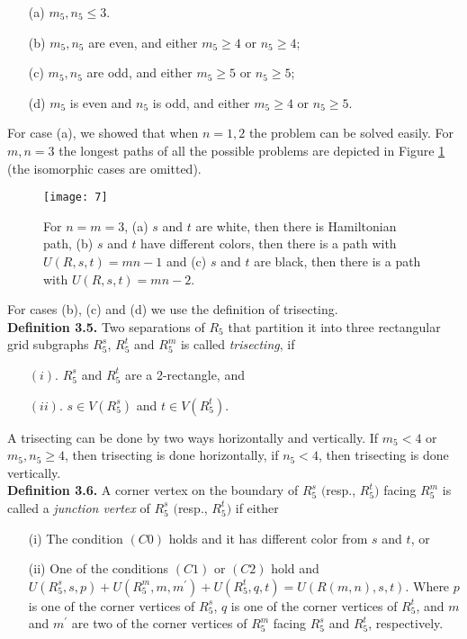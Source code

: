 \documentclass[preprint,12pt]{elsarticle}
\begin{document}
\begin{itemize}
\item[(a)] $m_{5},n_{5}\leq 3$.
\item[(b)] $m_{5},n_{5}$ are even, and either $m_{5}\geq4$ or $n_{5}\geq4$;
\item[(c)] $m_{5},n_{5}$ are odd, and either $m_{5}\geq5$ or $n_{5}\geq5$;
\item[(d)] $m_{5}$ is even and $n_{5}$ is odd, and either $m_{5}\geq4$ or $n_{5}\geq5$.
\end{itemize}
For case (a), we showed that when $n=1,2$ the problem can be solved
easily. For $m,n=3$ the longest paths of all the possible problems
are depicted in Figure \ref{k} (the isomorphic cases are omitted).
 \begin{figure}
  \centering
\texttt{[image: 7]}
  \caption[]{\small For $n=m=3$, (a) $s$ and $t$ are white, then there is Hamiltonian path,
   (b) $s$ and $t$ have different colors, then there is a path with $U(R,s,t)=mn-1$
   and (c) $s$ and $t$ are black, then there is a path with $U(R,s,t)=mn-2$.}
  \label{k}
\end{figure}
\par For cases (b), (c) and (d) we use
the definition of trisecting.\\


\noindent\textbf{Definition 3.5.} \cite{CST:AFAFCHPIM} Two
separations of $R_{5}$ that partition it into three rectangular grid
subgraphs $R^{s}_{5}$, $R^{t}_{5}$ and $R^{m}_{5}$ is called
\textit{trisecting}, if
\begin{itemize}
\item[$(i)$.] $R^{s}_{5}$ and $R^{t}_{5}$ are a 2-rectangle, and
\item[$(ii)$.] $s \in V(R^{s}_{5})$ and $t \in V(R^{t}_{5})$.
\end{itemize}

A trisecting can be done by two ways horizontally and vertically. If
$m_{5}<4$ or $m_{5},n_{5}\geq 4$, then trisecting is done
horizontally, if $n_{5}<4$, then trisecting is done vertically. \\

\noindent\textbf{Definition 3.6.} A corner vertex on the boundary of
$R^{s}_{5}$ $($resp., $R^{t}_{5})$ facing $R^{m}_{5}$ is called a
\textit{junction vertex} of $R^{s}_{5}$ $($resp., $R^{t}_{5})$ if
either
\begin{itemize}
\item [(i)] The condition $(C0)$ holds and it has different color from $s$ and
$t$, or
\item [(ii)] One of the conditions $(C1)$ or $(C2)$ hold and
$U(R_{5}^{s},s,p)+U(R_{5}^{m},m,m^{'})+U(R_{5}^{t},q,t)=U(R(m,n),s,t)$.
Where $p$ is one of the corner vertices of $R^{s}_5$, $q$ is one of
the corner vertices of $R^{t}_5$, and $m$ and $m^{'}$ are two of the
corner vertices of $R^{m}_5$ facing $R^{s}_5$ and $R^{t}_5$,
respectively.
\end{itemize}
\end{document}
